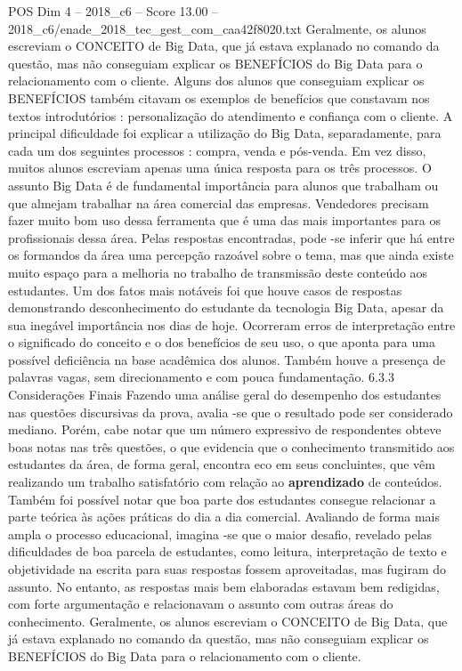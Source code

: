 \begin{textsample}{POS Dim 4 – 2018\_c6 – Score 13.00 – 2018\_c6/enade\_2018\_tec\_gest\_com\_caa42f8020.txt}
Geralmente, os alunos escreviam o CONCEITO de Big Data, que já estava explanado no comando da questão, mas não conseguiam explicar os BENEFÍCIOS do Big Data para o relacionamento com o cliente.
Alguns dos alunos que conseguiam explicar os BENEFÍCIOS também citavam os exemplos de benefícios que constavam nos textos introdutórios : personalização do atendimento e confiança com o cliente.
A principal dificuldade foi explicar a utilização do Big Data, separadamente, para cada um dos seguintes processos : compra, venda e pós-venda.
Em vez disso, muitos alunos escreviam apenas uma única resposta para os três processos.
O assunto Big Data é de fundamental importância para alunos que trabalham ou que almejam trabalhar na área comercial das empresas.
Vendedores precisam fazer muito bom uso dessa ferramenta que é uma das mais importantes para os profissionais dessa área.
Pelas respostas encontradas, pode -se inferir que há entre os formandos da área uma percepção razoável sobre o tema, mas que ainda existe muito espaço para a melhoria no trabalho de transmissão deste conteúdo aos estudantes.
Um dos fatos mais notáveis foi que houve casos de respostas demonstrando desconhecimento do estudante da tecnologia Big Data, apesar da sua inegável importância nos dias de hoje.
Ocorreram erros de interpretação entre o significado do conceito e o dos benefícios de seu uso, o que aponta para uma possível deficiência na base acadêmica dos alunos.
Também houve a presença de palavras vagas, sem direcionamento e com pouca fundamentação. 6.3.3 Considerações Finais Fazendo uma análise geral do desempenho dos estudantes nas questões discursivas da prova, avalia -se que o resultado pode ser considerado mediano.
Porém, cabe notar que um número expressivo de respondentes obteve boas notas nas três questões, o que evidencia que o conhecimento transmitido aos estudantes da área, de forma geral, encontra eco em seus concluintes, que vêm realizando um trabalho satisfatório com relação ao \textbf{aprendizado} de conteúdos.
Também foi possível notar que boa parte dos estudantes consegue relacionar a parte teórica às ações práticas do dia a dia comercial.
Avaliando de forma mais ampla o processo educacional, imagina -se que o maior desafio, revelado pelas dificuldades de boa parcela de estudantes, como leitura, interpretação de texto e objetividade na escrita para suas respostas fossem aproveitadas, mas fugiram do assunto.
No entanto, as respostas mais bem elaboradas estavam bem redigidas, com forte argumentação e relacionavam o assunto com outras áreas do conhecimento.
Geralmente, os alunos escreviam o CONCEITO de Big Data, que já estava explanado no comando da questão, mas não conseguiam explicar os BENEFÍCIOS do Big Data para o relacionamento com o cliente.

\end{textsample}
